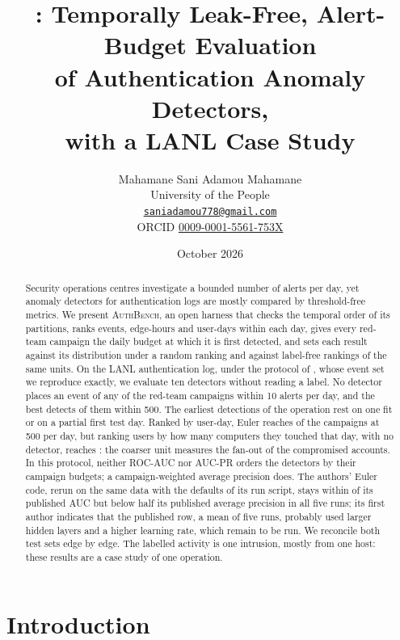 \documentclass[11pt,a4paper]{article}
\title{\AuthBench{}: Temporally Leak-Free, Alert-Budget Evaluation\\
of Authentication Anomaly Detectors,\\
with a LANL Case Study}
\author{Mahamane Sani Adamou Mahamane\\[2pt]
\small University of the People\\
\small \href{mailto:saniadamou778@gmail.com}{\texttt{saniadamou778@gmail.com}}\\
\small ORCID \href{https://orcid.org/0009-0001-5561-753X}{0009-0001-5561-753X}}
\date{October 2026}
\newcommand{\AuthBench}{\textsc{AuthBench}}
\begin{document}
\maketitle

\begin{abstract}
\noindent Security operations centres investigate a bounded number of alerts per day, yet anomaly detectors for authentication logs are mostly compared by threshold-free metrics. We present \AuthBench{}, an open harness that checks the temporal order of its partitions, ranks events, edge-hours and user-days within each day, gives every red-team campaign the daily budget at which it is first detected, and sets each result against its distribution under a random ranking and against label-free rankings of the same units. On the LANL authentication log, under the protocol of \textcite{larroche2026fair}, whose event set we reproduce exactly, we evaluate ten detectors without reading a label. No detector places an event of any of the \HarmTestCampaigns{} red-team campaigns within 10 alerts per day, and the best detects \HarmVaeRecallFiveHundredCount{} of them within 500. The earliest detections of the operation rest on one fit or on a partial first test day. Ranked by user-day, Euler reaches \HarmEulerUserDayFiveHundred{} of the campaigns at 500 per day, but ranking users by how many computers they touched that day, with no detector, reaches \HarmBaselineDstUserDayFiveHundred{}: the coarser unit measures the fan-out of the compromised accounts. In this protocol, neither ROC-AUC nor AUC-PR orders the detectors by their campaign budgets; a campaign-weighted average precision does. The authors' Euler code, rerun on the same data with the defaults of its run script, stays within \EulerAuthorsAucGap{} of its published AUC but below half its published average precision in all five runs; its first author indicates that the published row, a mean of five runs, probably used larger hidden layers and a higher learning rate, which remain to be run. We reconcile both test sets edge by edge. The labelled activity is one intrusion, mostly from one host: these results are a case study of one operation.
\end{abstract}

\clearpage
\tableofcontents
\clearpage

\section{Introduction}
\label{sec:introduction}
\end{document}
